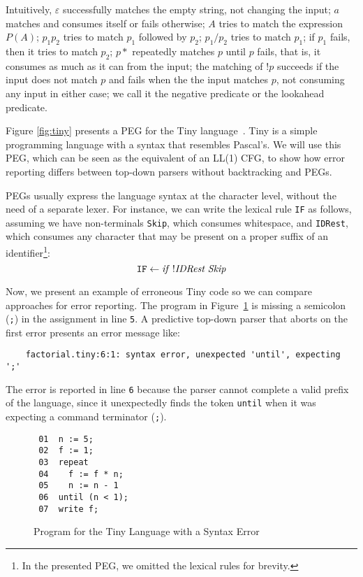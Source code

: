 \documentclass[3p,12pt,singlecolumn]{elsarticle}
\begin{document}
Intuitively,
$\varepsilon$ successfully matches the empty string, not changing
the input;
$a$ matches and consumes itself or fails otherwise;
$A$ tries to match the expression $P(A)$;
$p_1 p_2$ tries to match $p_1$ followed by $p_2$;
$p_1 / p_2$ tries to match $p_1$;
if $p_1$ fails, then it tries to match $p_2$;
$p*$ repeatedly matches $p$ until $p$ fails, that is, it
consumes as much as it can from the input;
the matching of $!p$ succeeds if the input does not match $p$
and fails when the the input matches $p$, not consuming any input in either case;
we call it the negative predicate or the lookahead predicate.

Figure \ref{fig:tiny} presents a PEG for the Tiny language~\cite{louden1997ccp}.
Tiny is a simple programming language with a syntax that resembles
Pascal's. 
We will use this PEG, which can be seen as the equivalent of an LL(1) CFG,
to show how error reporting differs between top-down parsers without backtracking
and PEGs.

PEGs usually express the language syntax at the character level,
without the need of a separate lexer.
For instance, we can write the lexical rule \texttt{IF} as follows,
assuming we have non-terminals {\tt Skip}, which consumes whitespace,
and {\tt IDRest}, which consumes any character that may
be present on a proper suffix of an identifier\footnote{In the presented PEG, we omitted the lexical rules for brevity.}:
\[
  {\tt IF} \leftarrow \it{if \; !IDRest \; Skip}
\]

Now, we present an example of erroneous Tiny code so we can compare
approaches for error reporting.
The program in Figure~\ref{fig:tinyerror} is missing a semicolon
(\texttt{;}) in the assignment in line \texttt{5}.
A predictive top-down parser that aborts on the first error presents
an error message like:

\begin{verbatim}
    factorial.tiny:6:1: syntax error, unexpected 'until', expecting ';'
\end{verbatim}

The error is reported in line \texttt{6} because the parser cannot
complete a valid prefix of the language, since it unexpectedly
finds the token \texttt{until} when it was expecting a command
terminator (\texttt{;}).

\begin{figure}[t]
\begin{verbatim}
 01  n := 5;
 02  f := 1;
 03  repeat
 04    f := f * n;
 05    n := n - 1
 06  until (n < 1);
 07  write f;
\end{verbatim}
\caption{Program for the Tiny Language with a Syntax Error}
\label{fig:tinyerror}
\end{figure}
\end{document}
